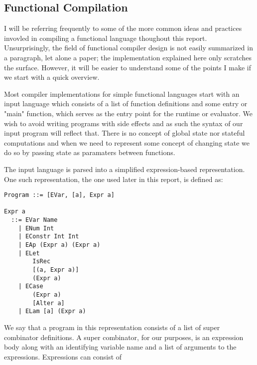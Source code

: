 \subsection{Functional Compilation}
I will be referring frequently to some of the more common ideas and practices
invovled in compiling a functional language thoughout this report. Unsurprisingly,
the field of functional compiler design is not easily summarized in a paragraph,
let alone a paper; the implementation explained here only scratches the surface.
However, it will be easier to understand some of the points I make if we start
with a quick overview.

Most compiler implementations for simple functional languages start with an 
input language which consists of a list of function definitions and some entry
or "main" function, which serves as the entry point for the runtime or evaluator.
We wish to avoid writing programs with side effects and as such the syntax of
our input program will reflect that. There is no concept of global state nor
stateful computations and when we need to represent some concept of changing
state we do so by passing state as paramaters between functions. 

The input language is parsed into a simplified expression-based representation.
One such representation, the one used later in this report, is defined as:

\begin{verbatim}
Program ::= [EVar, [a], Expr a]

Expr a
  ::= EVar Name
    | ENum Int
    | EConstr Int Int
    | EAp (Expr a) (Expr a)
    | ELet 
        IsRec
        [(a, Expr a)]
        (Expr a)
    | ECase
        (Expr a)
        [Alter a]
    | ELam [a] (Expr a)
\end{verbatim}

\noindent We say that a program in this representation consists of a list of
super combinator definitions. A super combinator, for our purposes, is an 
expression body along with an identifying variable name and a list of arguments
to the expressions. Expressions can consist of

